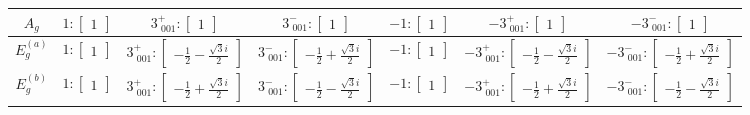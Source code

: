 \documentclass[fleqn,8pt,landscape]{jsarticle}
\begin{document}
\begin{longtable}{ccccccc}
$ A_{g} $ & $ 1:\begin{bmatrix} 1 \end{bmatrix} $ & $ 3^{+}_{\,\,001}:\begin{bmatrix} 1 \end{bmatrix} $ & $ 3^{-}_{\,\,001}:\begin{bmatrix} 1 \end{bmatrix} $ & $ -1:\begin{bmatrix} 1 \end{bmatrix} $ & $ -3^{+}_{\,\,001}:\begin{bmatrix} 1 \end{bmatrix} $ & $ -3^{-}_{\,\,001}:\begin{bmatrix} 1 \end{bmatrix} $ \\ \hline
$ E_{g}^{(a)} $ & $ 1:\begin{bmatrix} 1 \end{bmatrix} $ & $ 3^{+}_{\,\,001}:\begin{bmatrix} - \frac{1}{2} - \frac{\sqrt{3} i}{2} \end{bmatrix} $ & $ 3^{-}_{\,\,001}:\begin{bmatrix} - \frac{1}{2} + \frac{\sqrt{3} i}{2} \end{bmatrix} $ & $ -1:\begin{bmatrix} 1 \end{bmatrix} $ & $ -3^{+}_{\,\,001}:\begin{bmatrix} - \frac{1}{2} - \frac{\sqrt{3} i}{2} \end{bmatrix} $ & $ -3^{-}_{\,\,001}:\begin{bmatrix} - \frac{1}{2} + \frac{\sqrt{3} i}{2} \end{bmatrix} $ \\ \hline
$ E_{g}^{(b)} $ & $ 1:\begin{bmatrix} 1 \end{bmatrix} $ & $ 3^{+}_{\,\,001}:\begin{bmatrix} - \frac{1}{2} + \frac{\sqrt{3} i}{2} \end{bmatrix} $ & $ 3^{-}_{\,\,001}:\begin{bmatrix} - \frac{1}{2} - \frac{\sqrt{3} i}{2} \end{bmatrix} $ & $ -1:\begin{bmatrix} 1 \end{bmatrix} $ & $ -3^{+}_{\,\,001}:\begin{bmatrix} - \frac{1}{2} + \frac{\sqrt{3} i}{2} \end{bmatrix} $ & $ -3^{-}_{\,\,001}:\begin{bmatrix} - \frac{1}{2} - \frac{\sqrt{3} i}{2} \end{bmatrix} $ \\ \hline

\end{longtable}
\end{document}
